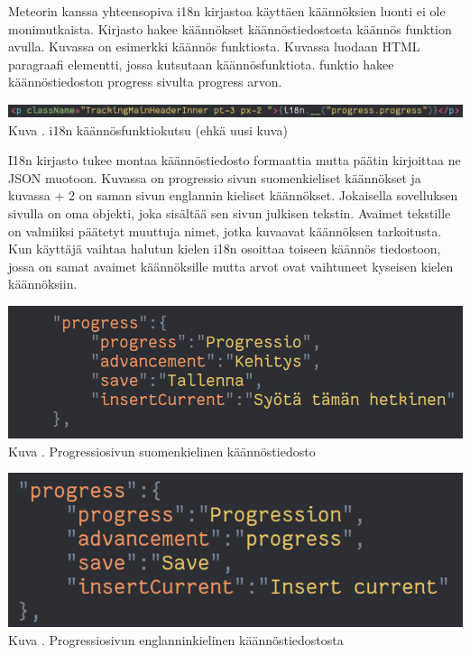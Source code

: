 \documentclass[11pt,a4paper,titlepage,oneside]{article}
\begin{document}

Meteorin kanssa yhteensopiva i18n kirjastoa käyttäen käännöksien luonti ei ole monimutkaista.
Kirjasto hakee käännökset käännöstiedostosta käännös funktion avulla.
Kuvassa \nextImageCount{} on esimerkki käännös funktiosta.
Kuvassa luodaan HTML paragraafi elementti, jossa kutsutaan käännösfunktiota. 
funktio hakee käännöstiedoston progress sivulta progress arvon.\\
\medskip

\bigskip
\includegraphics[width = 15cm]{src/public/oppar/translationcall.png}\\
Kuva \getImgCount. {} i18n käännösfunktiokutsu (ehkä uusi kuva)
\medskip



I18n kirjasto tukee montaa käännöstiedosto formaattia mutta päätin kirjoittaa ne JSON muotoon.
Kuvassa \nextImageCount{} on progressio sivun suomenkieliset käännökset ja kuvassa {\the\numexpr \theimgCounter + 2 } on saman sivun englannin kieliset käännökset.
Jokaisella sovelluksen sivulla on oma objekti, joka sisältää sen sivun julkisen tekstin. 
Avaimet tekstille on valmiiksi päätetyt muuttuja nimet, jotka kuvaavat käännöksen tarkoitusta.
Kun käyttäjä vaihtaa halutun kielen i18n osoittaa toiseen käännös tiedostoon, 
jossa on samat avaimet käännöksille mutta arvot ovat vaihtuneet kyseisen kielen käännöksiin.
\medskip


\bigskip
\includegraphics[width = 15cm]{src/public/oppar/translationfile.png}\\
Kuva \getImgCount. {} Progressiosivun suomenkielinen käännöstiedosto 
\medskip


\bigskip
\includegraphics[width = 15cm]{src/public/oppar/translationfileEng.png}\\
Kuva \getImgCount {}. Progressiosivun englanninkielinen käännöstiedostosta
\medskip
\end{document}
